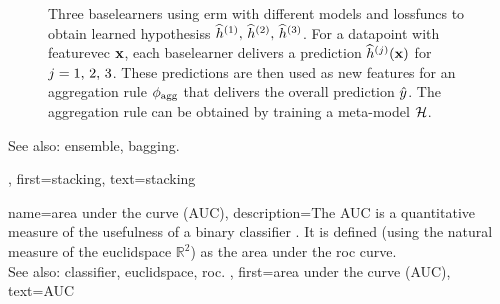 {{\begin{figure}[H]
\begin{center}
		\caption{Three \glspl{baselearner} using \gls{erm} with 
			different \glspl{model} and \glspl{lossfunc} to obtain learned \glspl{hypothesis} 
			$\widehat{h}^{(1)},\,\widehat{h}^{(2)},\,\widehat{h}^{(3)}$. 
			For a \gls{datapoint} with \gls{featurevec} ${\bf x}$, each \gls{baselearner} delivers a \gls{prediction}  
			$\widehat{h}^{(j)}({\bf x})$ for $j=1,\,2,\,3$. These 
			\glspl{prediction} are then used as new \glspl{feature} for an aggregation 
			rule $\phi_{\rm agg}$ that delivers the overall \gls{prediction} $\hat{y}$. 
			The aggregation rule can be obtained by \gls{training} a meta-\gls{model} $\mathcal{H}$.}
			\end{center}
		\end{figure}
	 	See also: \gls{ensemble}, \gls{bagging}.},
	 first={stacking},
	 text={stacking} 
}

{name={area under the curve (AUC)}, 
	description={The AUC is a quantitative \gls{measure} of the 
 		usefulness of a binary \gls{classifier} \cite{Hanley:1982aa}. It 
		is defined (using the natural \gls{measure} of the \gls{euclidspace} $\mathbb{R}^{2}$) as the area  
		under the \gls{roc} curve.
		\\
		See also: \gls{classifier}, \gls{euclidspace}, \gls{roc}. } , 
 	first={area under the curve (AUC)}, 
 	text={AUC} 
}

